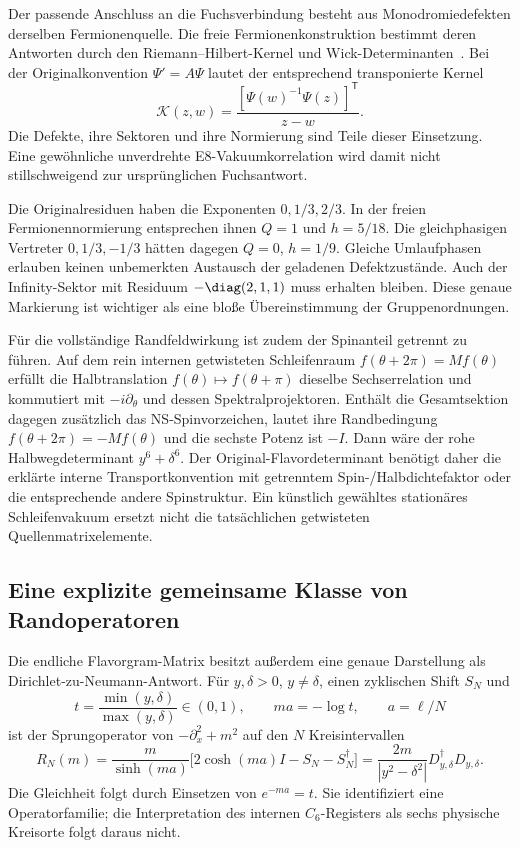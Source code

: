 Der passende Anschluss an die Fuchsverbindung besteht aus Monodromiedefekten derselben Fermionenquelle. Die freie Fermionenkonstruktion bestimmt deren Antworten durch den Riemann--Hilbert-Kernel und Wick-Determinanten~\cite{gavrylenkomarshakov}. Bei der Originalkonvention $\Psi'=A\Psi$ lautet der entsprechend transponierte Kernel
\begin{equation}
\mathcal K(z,w)=\frac{[\Psi(w)^{-1}\Psi(z)]^{\mathsf T}}{z-w}.
\end{equation}
Die Defekte, ihre Sektoren und ihre Normierung sind Teile dieser Einsetzung. Eine gewöhnliche unverdrehte E8-Vakuumkorrelation wird damit nicht stillschweigend zur ursprünglichen Fuchsantwort.

Die Originalresiduen haben die Exponenten $0,1/3,2/3$. In der freien Fermionennormierung entsprechen ihnen $Q=1$ und $h=5/18$. Die gleichphasigen Vertreter $0,1/3,-1/3$ hätten dagegen $Q=0$, $h=1/9$. Gleiche Umlaufphasen erlauben keinen unbemerkten Austausch der geladenen Defektzustände. Auch der Infinity-Sektor mit Residuum $-\diag(2,1,1)$ muss erhalten bleiben. Diese genaue Markierung ist wichtiger als eine bloße Übereinstimmung der Gruppenordnungen.

Für die vollständige Randfeldwirkung ist zudem der Spinanteil getrennt zu führen. Auf dem rein internen getwisteten Schleifenraum $f(\theta+2\pi)=Mf(\theta)$ erfüllt die Halbtranslation $f(\theta)\mapsto f(\theta+\pi)$ dieselbe Sechserrelation und kommutiert mit $-i\partial_\theta$ und dessen Spektralprojektoren. Enthält die Gesamtsektion dagegen zusätzlich das NS-Spinvorzeichen, lautet ihre Randbedingung $f(\theta+2\pi)=-Mf(\theta)$ und die sechste Potenz ist $-I$. Dann wäre der rohe Halbwegdeterminant $y^6+\delta^6$. Der Original-Flavordeterminant benötigt daher die erklärte interne Transportkonvention mit getrenntem Spin-/Halbdichtefaktor oder die entsprechende andere Spinstruktur. Ein künstlich gewähltes stationäres Schleifenvakuum ersetzt nicht die tatsächlichen getwisteten Quellenmatrixelemente.

\subsection{Eine explizite gemeinsame Klasse von Randoperatoren}
Die endliche Flavorgram-Matrix besitzt außerdem eine genaue Darstellung als Dirichlet-zu-Neumann-Antwort. Für $y,\delta>0$, $y\ne\delta$, einen zyklischen Shift $S_N$ und
\begin{equation}
t=\frac{\min(y,\delta)}{\max(y,\delta)}\in(0,1),\qquad
ma=-\log t,\qquad a=\ell/N
\end{equation}
ist der Sprungoperator von $-\partial_x^2+m^2$ auf den $N$ Kreisintervallen
\begin{equation}
R_N(m)=\frac{m}{\sinh(ma)}
\bigl[2\cosh(ma)I-S_N-S_N^\dagger\bigr]
=\boxed{\frac{2m}{|y^2-\delta^2|}D_{y,\delta}^\dagger D_{y,\delta}.}
\end{equation}
Die Gleichheit folgt durch Einsetzen von $e^{-ma}=t$. Sie identifiziert eine Operatorfamilie; die Interpretation des internen $C_6$-Registers als sechs physische Kreisorte folgt daraus nicht.

